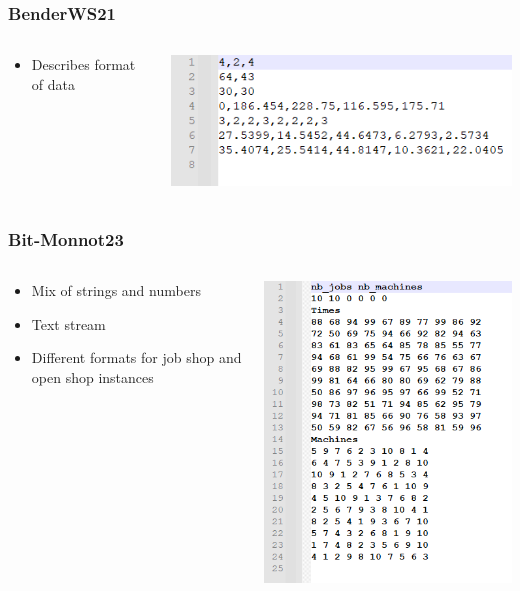\documentclass[dvipsnames,aspectratio=169]{beamer}
\begin{document}
\begin{frame}
\frametitle{BenderWS21 \cite{BenderWS21}}
\begin{columns}
\begin{column}{0.5\textwidth}
\begin{itemize}
\item Describes format of data
\end{itemize}
\end{column}
\begin{column}{0.5\textwidth}
\includegraphics[width=\textwidth]{images/BenderWS21}
\end{column}
\end{columns}
\end{frame}

\begin{frame}
\frametitle{Bit-Monnot23 \cite{Bit-Monnot23}}
\begin{columns}
\begin{column}{0.5\textwidth}
\begin{itemize}
\item Mix of strings and numbers
\item Text stream
\item Different formats for job shop and open shop instances
\end{itemize}
\end{column}
\begin{column}{0.5\textwidth}
\includegraphics[width=.7\textwidth]{images/Bit-Monnot23}
\end{column}
\end{columns}
\end{frame}
\end{document}

